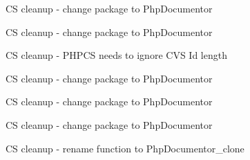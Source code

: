 \begin{DoxyRefList}
\-C\-S cleanup -\/ change package to \-Php\-Documentor 

\-C\-S cleanup -\/ change package to \-Php\-Documentor 

\-C\-S cleanup -\/ \-P\-H\-P\-C\-S needs to ignore \-C\-V\-S \-Id length 

\-C\-S cleanup -\/ change package to \-Php\-Documentor 

\-C\-S cleanup -\/ change package to \-Php\-Documentor 

\-C\-S cleanup -\/ change package to \-Php\-Documentor  
\item[\label{todo__todo000008}%
\hypertarget{todo__todo000008}{}%
\-Global \hyperlink{clone_8inc_8php_a9ec6db8d779481cc29803b039aef6968}{php\-Documentor\-\_\-clone} (\$obj)]\-C\-S cleanup -\/ rename function to \-Php\-Documentor\-\_\-clone 


\end{DoxyRefList}
